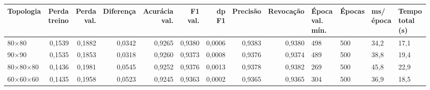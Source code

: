 \begin{tabular}{lrrrrrrrrllll}
\toprule
Topologia & Perda treino & Perda val. & Diferença & Acurácia val. & F1 val. & dp F1 & Precisão & Revocação & Época val. mín. & Épocas & ms/época & Tempo total (s) \\
\midrule
80×80 & 0,1539 & 0,1882 & 0,0342 & 0,9265 & 0,9380 & 0,0006 & 0,9383 & 0,9380 & 498 & 500 & 34,2 & 17,1 \\
90×90 & 0,1535 & 0,1853 & 0,0318 & 0,9260 & 0,9373 & 0,0008 & 0,9376 & 0,9374 & 489 & 500 & 38,8 & 19,4 \\
80×80×80 & 0,1436 & 0,1981 & 0,0545 & 0,9252 & 0,9376 & 0,0013 & 0,9378 & 0,9382 & 269 & 500 & 45,8 & 22,9 \\
60×60×60 & 0,1435 & 0,1958 & 0,0523 & 0,9245 & 0,9363 & 0,0002 & 0,9365 & 0,9365 & 304 & 500 & 36,9 & 18,5 \\
\bottomrule
\end{tabular}
